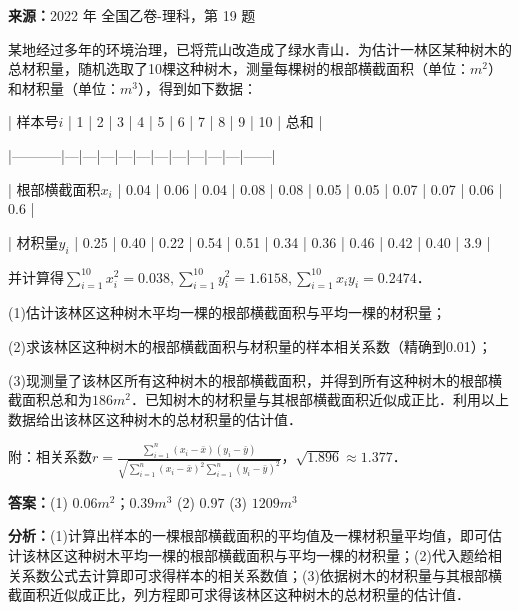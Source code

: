 \begin{question}[points=12]
\textbf{来源：}2022 年 全国乙卷-理科，第 19 题\par
某地经过多年的环境治理，已将荒山改造成了绿水青山．为估计一林区某种树木的总材积量，随机选取了10棵这种树木，测量每棵树的根部横截面积（单位：$m^2$）和材积量（单位：$m^3$），得到如下数据：



| 样本号$i$ | 1 | 2 | 3 | 4 | 5 | 6 | 7 | 8 | 9 | 10 | 总和 |

|-----------|---|---|---|---|---|---|---|---|---|---|------|

| 根部横截面积$x_i$ | 0.04 | 0.06 | 0.04 | 0.08 | 0.08 | 0.05 | 0.05 | 0.07 | 0.07 | 0.06 | 0.6 |

| 材积量$y_i$ | 0.25 | 0.40 | 0.22 | 0.54 | 0.51 | 0.34 | 0.36 | 0.46 | 0.42 | 0.40 | 3.9 |



并计算得$\sum\limits_{i=1}^{10} x_i^2 = 0.038, \sum\limits_{i=1}^{10} y_i^2 = 1.6158, \sum\limits_{i=1}^{10} x_i y_i = 0.2474$．

(1)估计该林区这种树木平均一棵的根部横截面积与平均一棵的材积量；

(2)求该林区这种树木的根部横截面积与材积量的样本相关系数（精确到0.01）；

(3)现测量了该林区所有这种树木的根部横截面积，并得到所有这种树木的根部横截面积总和为$186m^2$．已知树木的材积量与其根部横截面积近似成正比．利用以上数据给出该林区这种树木的总材积量的估计值．

附：相关系数$r=\frac{\sum\limits_{i=1}^n (x_i-\bar{x})(y_i-\bar{y})}{\sqrt{\sum\limits_{i=1}^n (x_i-\bar{x})^2 \sum\limits_{i=1}^n (y_i-\bar{y})^2}}$，$\sqrt{1.896} \approx 1.377$．
\begin{solution}
\textbf{答案：}(1) $0.06m^2$；$0.39m^3$
(2) $0.97$
(3) $1209m^3$

\textbf{分析：}(1)计算出样本的一棵根部横截面积的平均值及一棵材积量平均值，即可估计该林区这种树木平均一棵的根部横截面积与平均一棵的材积量；(2)代入题给相关系数公式去计算即可求得样本的相关系数值；(3)依据树木的材积量与其根部横截面积近似成正比，列方程即可求得该林区这种树木的总材积量的估计值．


\end{solution}
\end{question}
